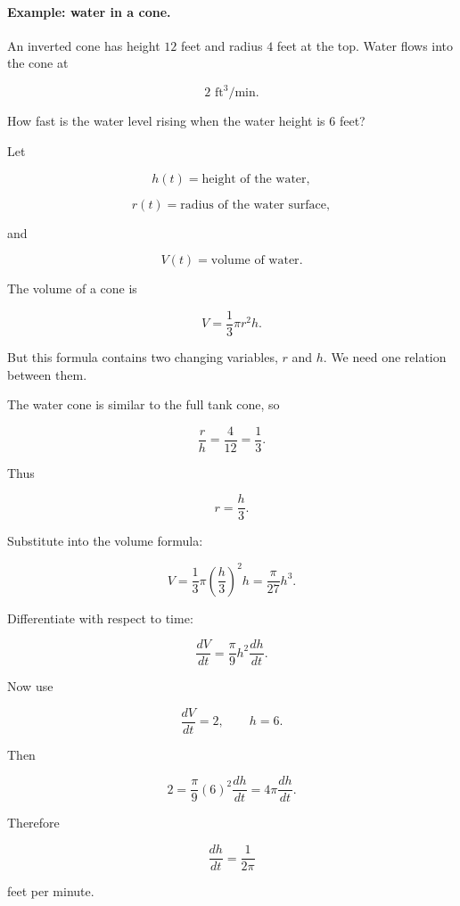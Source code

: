 \paragraph{Example: water in a cone.}
An inverted cone has height \(12\) feet and radius \(4\) feet at the top.  Water flows into
the cone at

\[
2\text{ ft}^3/\text{min}.
\]

How fast is the water level rising when the water height is \(6\) feet?

Let

\[
h(t)=\text{height of the water},
\]

\[
r(t)=\text{radius of the water surface},
\]

and

\[
V(t)=\text{volume of water}.
\]

The volume of a cone is

\[
V=\frac13\pi r^2h.
\]

But this formula contains two changing variables, \(r\) and \(h\).  We need one relation
between them.

The water cone is similar to the full tank cone, so

\[
\frac{r}{h}=\frac{4}{12}=\frac13.
\]

Thus

\[
r=\frac{h}{3}.
\]

Substitute into the volume formula:

\[
V
=
\frac13\pi\left(\frac{h}{3}\right)^2h
=
\frac{\pi}{27}h^3.
\]

Differentiate with respect to time:

\[
\frac{dV}{dt}
=
\frac{\pi}{9}h^2\frac{dh}{dt}.
\]

Now use

\[
\frac{dV}{dt}=2,
\qquad
h=6.
\]

Then

\[
2=
\frac{\pi}{9}(6)^2\frac{dh}{dt}
=
4\pi\frac{dh}{dt}.
\]

Therefore

\[
\boxed{
\frac{dh}{dt}=\frac{1}{2\pi}
}
\]

feet per minute.

